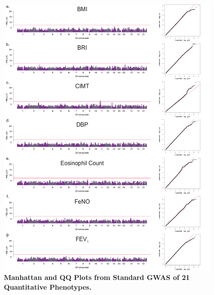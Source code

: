  
\begin{figure}[!htb]
	\centering
		\includegraphics[width=5in]{img/ch02/fig-s1a.pdf}
	\caption[Manhattan and QQ Plots from Standard GWAS of 21 Quantitative Phenotypes.]{\textbf{Manhattan and QQ Plots from Standard GWAS of 21 Quantitative Phenotypes.} }
	\label{fig:fig-s1a}
\end{figure}

